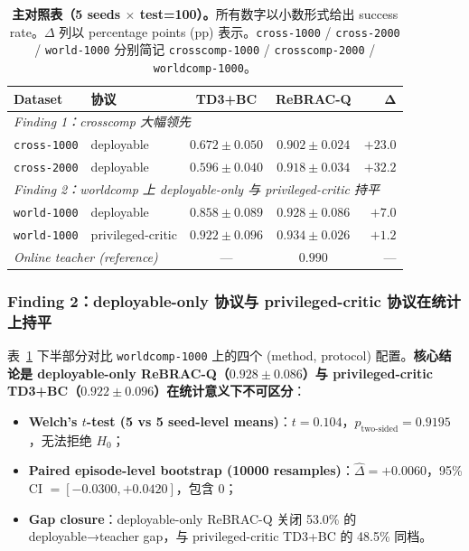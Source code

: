 \begin{table}[t]
\centering
\small
\caption{\textbf{主对照表（5 seeds $\times$ test=100）。}所有数字以小数形式给出 success rate。$\Delta$ 列以 percentage points (pp) 表示。\texttt{cross-1000} / \texttt{cross-2000} / \texttt{world-1000} 分别简记 \texttt{crosscomp-1000} / \texttt{crosscomp-2000} / \texttt{worldcomp-1000}。}
\label{tab:main_table}
\begin{tabular}{llccr}
\toprule
\textbf{Dataset} & \textbf{协议} & \textbf{TD3+BC} & \textbf{ReBRAC-Q} & $\boldsymbol{\Delta}$ \\
\midrule
\multicolumn{5}{l}{\emph{Finding 1：crosscomp 大幅领先}} \\
\texttt{cross-1000} & deployable & $0.672 \pm 0.050$ & $\mathbf{0.902 \pm 0.024}$ & $+23.0$ \\
\texttt{cross-2000} & deployable & $0.596 \pm 0.040$ & $\mathbf{0.918 \pm 0.034}$ & $+32.2$ \\
\midrule
\multicolumn{5}{l}{\emph{Finding 2：worldcomp 上 deployable-only 与 privileged-critic 持平}} \\
\texttt{world-1000} & deployable & $0.858 \pm 0.089$ & $\mathbf{0.928 \pm 0.086}$ & $+7.0$ \\
\texttt{world-1000} & privileged-critic & $0.922 \pm 0.096$ & $\mathbf{0.934 \pm 0.026}$ & $+1.2$ \\
\midrule
\multicolumn{2}{l}{\emph{Online teacher (reference)}} & — & $0.990$ & — \\
\bottomrule
\end{tabular}
\end{table}

\subsubsection{Finding 2：deployable-only 协议与 privileged-critic 协议在统计上持平}
\label{subsubsec:finding_2}

表~\ref{tab:main_table} 下半部分对比 \texttt{worldcomp-1000} 上的四个 (method, protocol) 配置。\textbf{核心结论是 deployable-only ReBRAC-Q（$0.928 \pm 0.086$）与 privileged-critic TD3+BC（$0.922 \pm 0.096$）在统计意义下不可区分}：

\begin{itemize}
    \item \textbf{Welch's $t$-test (5 vs 5 seed-level means)}：$t=0.104$，$p_{\text{two-sided}}=0.9195$，无法拒绝 $H_0$；
    \item \textbf{Paired episode-level bootstrap (10000 resamples)}：$\hat{\Delta}=+0.0060$，95\% CI $=[-0.0300, +0.0420]$，包含 0；
    \item \textbf{Gap closure}：deployable-only ReBRAC-Q 关闭 53.0\% 的 deployable→teacher gap，与 privileged-critic TD3+BC 的 48.5\% 同档。
\end{itemize}

